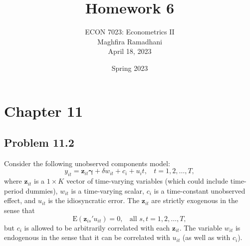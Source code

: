 \documentclass[10pt]{article}
\newcommand{\E}{\text{E}}
\begin{document}
 
\title{Homework 6}
\author{ECON 7023: Econometrics II\\
Maghfira Ramadhani\\
April 18, 2023}
\date{Spring 2023}
\maketitle

\section*{Chapter 11}
\subsection*{Problem 11.2}
Consider the following unobserved components model:
\[y_{it}=\textbf{z}_{it}\pmb{\gamma}+\delta w_{it}+c_i+u_it,\ \ \ \ t=1,2,\ldots,T,\]
where $\textbf{z}_{it}$ is a $1\times K$ vector of time-varying variables (which could include time-period dummies), $w_{it}$ is a time-varying scalar, $c_i$ is a time-constant unobserved effect, and $u_{it}$ is the idiosyncratic error. The $\textbf{z}_{it}$ are strictly exogenous in the sense that
\[\E(\textbf{z}_{is}'u_{it})=0,\ \ \ \ \text{all }s,t=1,2,\ldots,T,\tag{11.99}\label{11.99}\]
but $c_i$ is allowed to be arbitrarily correlated with each $\textbf{z}_{it}$. The variable $w_{it}$ is endogenous in the sense that it can be correlated with $u_{it}$ (as well as with $c_i$).
\end{document}
